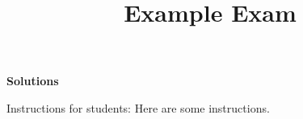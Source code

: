 \documentclass[
  12pt,
]{exam}
\title{Example Exam}
\author{}
\date{}
\begin{document}
\maketitle





\pagestyle{headandfoot}


\ifprintanswers
\textbf{Solutions} \fi

\ifprintanswers \else

\begin{center}
Instructions for students:
Here are some instructions.
\end{center}
\fi

\vspace{0.5cm}
\end{document}
